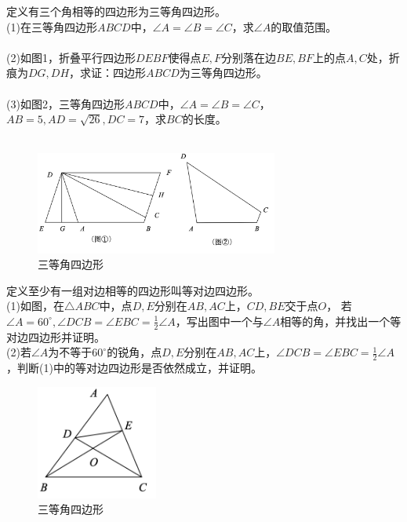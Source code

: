 \documentclass{ecnuthesis}
\begin{document}
\begin{problem}
    定义有三个角相等的四边形为三等角四边形。\\
    (1)在三等角四边形$ABCD$中，$\angle A=\angle B=\angle C$，求$\angle A$的取值范围。 \\
    \\
    (2)如图1，折叠平行四边形$DEBF$使得点$E,F$分别落在边$BE,BF$上的点$A,C$处，折痕为$DG,DH$，求证：四边形$ABCD$为三等角四边形。\\
    \\
    (3)如图2，三等角四边形$ABCD$中，$\angle A=\angle B=\angle C$，$AB=5,AD=\sqrt{26},DC=7$，求$BC$的长度。 \\
    \\
\end{problem}
\begin{figure}[H]
\centering
\includegraphics[width=8cm]{picture/6_1_1.png}
\caption{三等角四边形}
\end{figure}
\begin{problem}
    定义至少有一组对边相等的四边形叫等对边四边形。\\
    (1)如图，在$\triangle ABC$中，点$D,E$分别在$AB,AC$上，$CD,BE$交于点$O$，
    若$\angle A=60^\circ,\angle DCB=\angle EBC=\frac{1}{2}\angle A$，写出图中一个与$\angle A$相等的角，并找出一个等对边四边形并证明。\\
    (2)若$\angle A$为不等于$60^\circ$的锐角，点$D,E$分别在$AB,AC$上，$\angle DCB=\angle EBC=\frac{1}{2}\angle A$，判断(1)中的等对边四边形是否依然成立，并证明。\\
\end{problem}
\begin{figure}[H]
\centering
\includegraphics[width=4cm]{picture/6125.png}
\caption{三等角四边形}
\end{figure}
\clearpage
\end{document}
